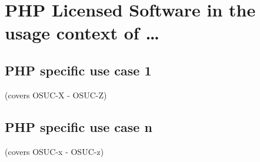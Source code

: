%
%
%
%
%



\section{PHP Licensed Software in the usage context of \ldots}
\label{OSUC-01-PHP} \label{OSUC-03-PHP} 
\label{OSUC-06-PHP} \label{OSUC-09-PHP}

\label{OSUC-02-PHP} \label{OSUC-04-PHP} \label{OSUC-05-PHP}
\label{OSUC-07-PHP} \label{OSUC-08-PHP} \label{OSUC-10-PHP}


\subsection{PHP specific use case 1}
(covers OSUC-X - OSUC-Z)

\subsection{PHP specific use case n}
(covers OSUC-x - OSUC-z)


%
